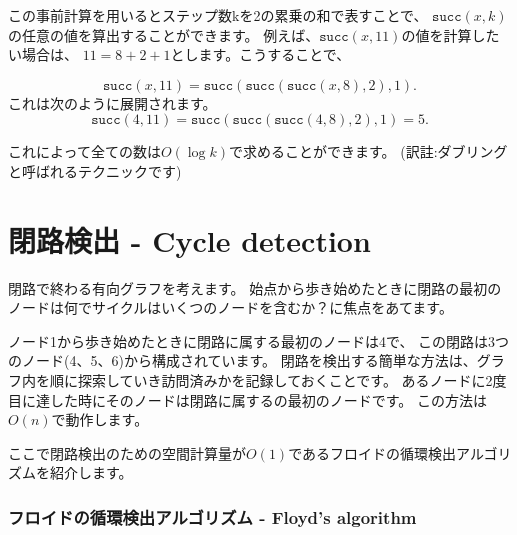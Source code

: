 この事前計算を用いるとステップ数kを2の累乗の和で表すことで、
$\texttt{succ}(x,k)$の任意の値を算出することができます。
例えば、$\texttt{succ}(x,11)$の値を計算したい場合は、
$11 = 8 + 2 + 1$とします。こうすることで、

\[\texttt{succ}(x,11)=\texttt{succ}(\texttt{succ}(\texttt{succ}(x,8),2),1).\]
これは次のように展開されます。
\[\texttt{succ}(4,11)=\texttt{succ}(\texttt{succ}(\texttt{succ}(4,8),2),1)=5.\]

これによって全ての数は$O(\log k)$で求めることができます。
(訳註:ダブリングと呼ばれるテクニックです)

\section{閉路検出 - Cycle detection}


閉路で終わる有向グラフを考えます。
始点から歩き始めたときに閉路の最初のノードは何でサイクルはいくつのノードを含むか？に焦点をあてます。
\begin{center}
\end{center}

ノード1から歩き始めたときに閉路に属する最初のノードは4で、
この閉路は3つのノード(4、5、6)から構成されています。
閉路を検出する簡単な方法は、グラフ内を順に探索していき訪問済みかを記録しておくことです。
あるノードに2度目に達した時にそのノードは閉路に属するの最初のノードです。
この方法は$O(n)$で動作します。

ここで閉路検出のための空間計算量が$O(1)$であるフロイドの循環検出アルゴリズムを紹介します。

\subsubsection{フロイドの循環検出アルゴリズム - Floyd's algorithm}

